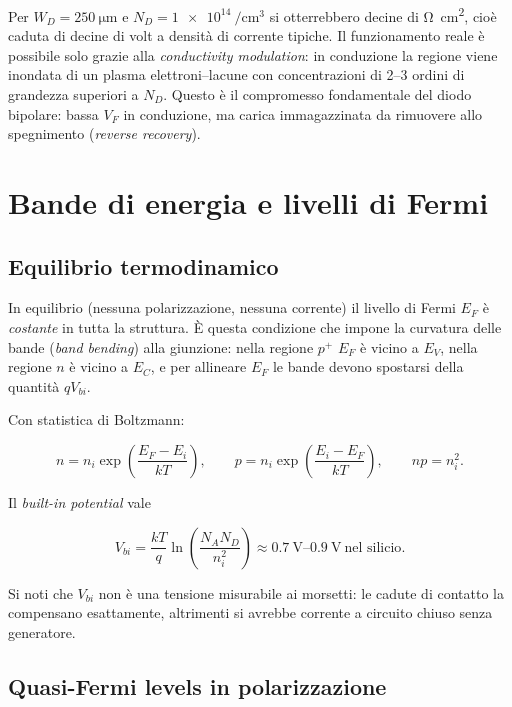 \documentclass[11pt,a4paper]{article}
\begin{document}
Per $W_D = \SI{250}{\micro\meter}$ e $N_D = \SI{1e14}{\per\centi\meter\cubed}$
si otterrebbero decine di \si{\ohm\centi\meter\squared}, cioè caduta di decine
di volt a densità di corrente tipiche. Il funzionamento reale è possibile solo
grazie alla \emph{conductivity modulation}: in conduzione la regione viene
inondata di un plasma elettroni--lacune con concentrazioni di 2--3 ordini di
grandezza superiori a $N_D$. Questo è il compromesso fondamentale del diodo
bipolare: bassa $V_F$ in conduzione, ma carica immagazzinata da rimuovere allo
spegnimento (\emph{reverse recovery}).

\section{Bande di energia e livelli di Fermi}

\subsection{Equilibrio termodinamico}

In equilibrio (nessuna polarizzazione, nessuna corrente) il livello di Fermi
$E_F$ è \emph{costante} in tutta la struttura. È questa condizione che impone la
curvatura delle bande (\emph{band bending}) alla giunzione: nella regione $p^{+}$
$E_F$ è vicino a $E_V$, nella regione $n$ è vicino a $E_C$, e per allineare
$E_F$ le bande devono spostarsi della quantità $qV_{bi}$.

Con statistica di Boltzmann:

\begin{equation}
n = n_i \exp\!\left(\frac{E_F - E_i}{kT}\right),
\qquad
p = n_i \exp\!\left(\frac{E_i - E_F}{kT}\right),
\qquad
np = n_i^{2} .
\end{equation}

Il \emph{built-in potential} vale

\begin{equation}
V_{bi} = \frac{kT}{q} \ln\!\left(\frac{N_A N_D}{n_i^{2}}\right)
\approx \SIrange{0.7}{0.9}{\volt} \ \text{nel silicio}.
\end{equation}

Si noti che $V_{bi}$ non è una tensione misurabile ai morsetti: le cadute di
contatto la compensano esattamente, altrimenti si avrebbe corrente a
circuito chiuso senza generatore.

\subsection{Quasi-Fermi levels in polarizzazione}
\end{document}
